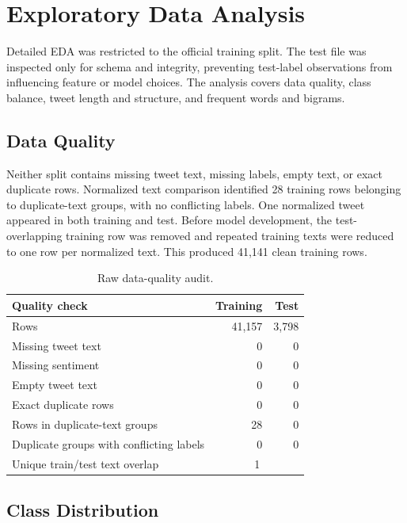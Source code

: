 \section{Exploratory Data Analysis}
\label{sec:eda}

Detailed EDA was restricted to the official training split. The test file was inspected only for schema and integrity, preventing test-label observations from influencing feature or model choices. The analysis covers data quality, class balance, tweet length and structure, and frequent words and bigrams.

\subsection{Data Quality}

Neither split contains missing tweet text, missing labels, empty text, or exact duplicate rows. Normalized text comparison identified 28 training rows belonging to duplicate-text groups, with no conflicting labels. One normalized tweet appeared in both training and test. Before model development, the test-overlapping training row was removed and repeated training texts were reduced to one row per normalized text. This produced 41,141 clean training rows.

\begin{table}[H]
\centering
\begin{tabular}{|l|r|r|}
\hline
Quality check & Training & Test \\
\hline
Rows & 41,157 & 3,798 \\
\hline
Missing tweet text & 0 & 0 \\
\hline
Missing sentiment & 0 & 0 \\
\hline
Empty tweet text & 0 & 0 \\
\hline
Exact duplicate rows & 0 & 0 \\
\hline
Rows in duplicate-text groups & 28 & 0 \\
\hline
Duplicate groups with conflicting labels & 0 & 0 \\
\hline
Unique train/test text overlap & \multicolumn{2}{|c|}{1} \\
\hline
\end{tabular}
\caption{Raw data-quality audit.}
\label{tab:data-quality}
\end{table}

\subsection{Class Distribution}

